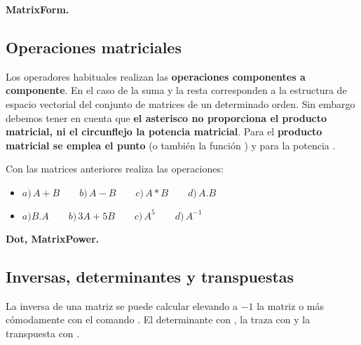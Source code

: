 \documentclass[a4paper,10pt, draft]{article}
\newcommand{\com}[1]{\textbf{\color{blue}{#1}}}
\newenvironment{ejer}{\begin{tcolorbox}[center title, title=Ejercicios,
fonttitle=\sffamily\bfseries,colback=blue!5,colframe=orange]}{\end{tcolorbox}}
\newenvironment{funciones}{\begin{tcolorbox}[center title, title=Nuevas funciones, fonttitle=\sffamily\bfseries, colback=green!5!white,colframe=red!75!black]}{\end{tcolorbox}\bigskip}
\begin{document}
\begin{funciones}

\textbf{MatrixForm.}


\end{funciones}

 \newpage

\subsection{Operaciones matriciales}

Los operadores habituales realizan las \textbf{operaciones componentes a componente}. En el caso de la suma y la resta corresponden a la estructura de espacio vectorial del conjunto de matrices de un determinado orden. Sin embargo debemos tener en cuenta que \textbf{el asterisco no proporciona el producto matricial, ni el circunflejo la potencia matricial}. Para el \textbf{producto matricial se emplea el punto} (o también la función \com{Dot[m,n]}) y para la potencia \com{MatrixPower[A,n]}.




\begin{ejer}

Con las matrices anteriores realiza las operaciones:

\begin{itemize}

\item $a)\,A+B\qquad b)\, A-B\qquad c)\, A*B \qquad d)\, A.B$

\item $a) B.A \qquad b)\,3A+5B \qquad c)\,A^5\qquad d)\, A^{-1}$


\end{itemize}


\end{ejer} 

\begin{funciones}

\textbf{Dot, MatrixPower.}


\end{funciones}


 \newpage

\subsection{Inversas, determinantes y transpuestas}

La inversa de una matriz se puede calcular elevando a $-1$ la matriz o más cómodamente con el comando \com{Inverse[A]}. El determinante con \com{Det[A]}, la traza con \com{Tr[A]} y la transpuesta con \com{Transpose[A]}.
\end{document}
